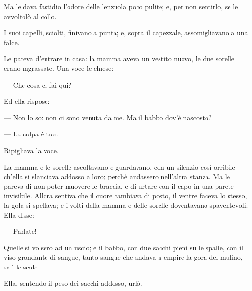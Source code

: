 Ma le dava fastidio l'odore delle lenzuola poco pulite; e, per non sentirlo, se le avvoltolò al collo.

I suoi capelli, sciolti, finivano a punta; e, sopra il capezzale, assomigliavano a una falce.

Le pareva d'entrare in casa: la mamma aveva un vestito nuovo, le due sorelle erano ingrassate. Una voce le chiese:

— Che cosa ci fai qui?

Ed ella rispose:

— Non lo so: non ci sono venuta da me. Ma il babbo dov'è nascosto?

— La colpa è tua.

Ripigliava la voce.

La mamma e le sorelle ascoltavano e guardavano, con un silenzio così orribile ch'ella si slanciava addosso a loro; perchè andassero nell'altra stanza. Ma le pareva di non poter muovere le braccia, e di urtare con il capo in una parete invisibile. Allora sentiva che il cuore cambiava di posto, il ventre faceva lo stesso, la gola si spellava; e i volti della mamma e delle sorelle doventavano spaventevoli. Ella disse:

— Parlate!

Quelle si volsero ad un uscio; e il babbo, con due sacchi pieni su le spalle, con il viso grondante di sangue, tanto sangue che andava a empire la gora del mulino, salì le scale.

Ella, sentendo il peso dei sacchi addosso, urlò.
